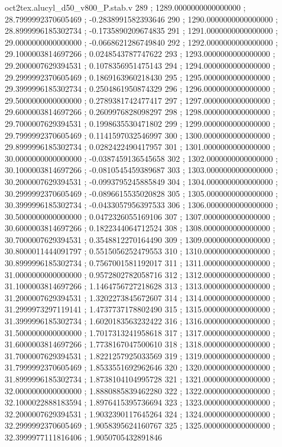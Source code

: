 \begin{filecontents}[overwrite]{oct2tex.alucyl_d50_v800_P.stab.v}
289 ; 1289.0000000000000000 ; 28.7999992370605469 ; -0.2838991582393646
290 ; 1290.0000000000000000 ; 28.8999996185302734 ; -0.1735890209674835
291 ; 1291.0000000000000000 ; 29.0000000000000000 ; -0.0668621286749840
292 ; 1292.0000000000000000 ; 29.1000003814697266 ; 0.0248543787747622
293 ; 1293.0000000000000000 ; 29.2000007629394531 ; 0.1078356951475143
294 ; 1294.0000000000000000 ; 29.2999992370605469 ; 0.1869163960218430
295 ; 1295.0000000000000000 ; 29.3999996185302734 ; 0.2504861950874329
296 ; 1296.0000000000000000 ; 29.5000000000000000 ; 0.2789381742477417
297 ; 1297.0000000000000000 ; 29.6000003814697266 ; 0.2609976828098297
298 ; 1298.0000000000000000 ; 29.7000007629394531 ; 0.1998635530471802
299 ; 1299.0000000000000000 ; 29.7999992370605469 ; 0.1141597032546997
300 ; 1300.0000000000000000 ; 29.8999996185302734 ; 0.0282422490417957
301 ; 1301.0000000000000000 ; 30.0000000000000000 ; -0.0387459136545658
302 ; 1302.0000000000000000 ; 30.1000003814697266 ; -0.0810545459389687
303 ; 1303.0000000000000000 ; 30.2000007629394531 ; -0.0993795245885849
304 ; 1304.0000000000000000 ; 30.2999992370605469 ; -0.0896615535020828
305 ; 1305.0000000000000000 ; 30.3999996185302734 ; -0.0433057956397533
306 ; 1306.0000000000000000 ; 30.5000000000000000 ; 0.0472326055169106
307 ; 1307.0000000000000000 ; 30.6000003814697266 ; 0.1822344064712524
308 ; 1308.0000000000000000 ; 30.7000007629394531 ; 0.3548812270164490
309 ; 1309.0000000000000000 ; 30.8000011444091797 ; 0.5515056252479553
310 ; 1310.0000000000000000 ; 30.8999996185302734 ; 0.7567001581192017
311 ; 1311.0000000000000000 ; 31.0000000000000000 ; 0.9572802782058716
312 ; 1312.0000000000000000 ; 31.1000003814697266 ; 1.1464756727218628
313 ; 1313.0000000000000000 ; 31.2000007629394531 ; 1.3202273845672607
314 ; 1314.0000000000000000 ; 31.2999973297119141 ; 1.4737737178802490
315 ; 1315.0000000000000000 ; 31.3999996185302734 ; 1.6020183563232422
316 ; 1316.0000000000000000 ; 31.5000000000000000 ; 1.7017313241958618
317 ; 1317.0000000000000000 ; 31.6000003814697266 ; 1.7738167047500610
318 ; 1318.0000000000000000 ; 31.7000007629394531 ; 1.8221257925033569
319 ; 1319.0000000000000000 ; 31.7999992370605469 ; 1.8533551692962646
320 ; 1320.0000000000000000 ; 31.8999996185302734 ; 1.8738104104995728
321 ; 1321.0000000000000000 ; 32.0000000000000000 ; 1.8880885839462280
322 ; 1322.0000000000000000 ; 32.1000022888183594 ; 1.8976415395736694
323 ; 1323.0000000000000000 ; 32.2000007629394531 ; 1.9032390117645264
324 ; 1324.0000000000000000 ; 32.2999992370605469 ; 1.9058395624160767
325 ; 1325.0000000000000000 ; 32.3999977111816406 ; 1.9050705432891846

\end{filecontents}
